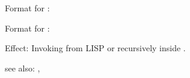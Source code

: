 \relfun

Format for : 

Format for : 

Effect: Invoking \RELFUN{} from LISP or recursively inside \RELFUN{}.

see also: \bye ,\style
